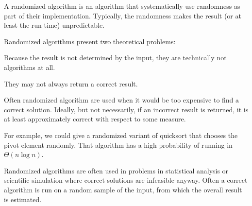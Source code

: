 A randomized algorithm is an algorithm that systematically use randomness as part of their implementation.
Typically, the randomness makes the result (or at least the run time) unpredictable.

Randomized algorithms present two theoretical problems:
\begin{compactenum}
\item Because the result is not determined by the input, they are technically not algorithms at all.
\item They may not always return a correct result.
\end{compactenum}

Often randomized algorithm are used when it would be too expensive to find a correct solution.
Ideally, but not necessarily, if an incorrect result is returned, it is at least approximately correct with respect to some measure.

For example, we could give a randomized variant of quicksort that chooses the pivot element randomly.
That algorithm has a high probability of running in $\Theta(n\log n)$.

Randomized algorithms are often used in problems in statistical analysis or scientific simulation where correct solutions are infeasible anyway.
Often a correct algorithm is run on a random sample of the input, from which the overall result is estimated.